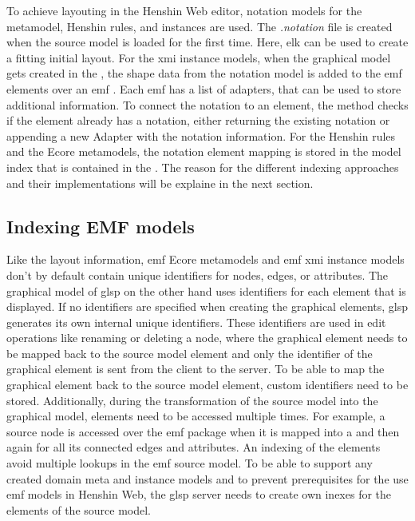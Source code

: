   To achieve layouting in the Henshin Web editor, notation models for the metamodel, Henshin rules, and instances are used. The \textit{.notation} file is created when the source model is loaded for the first time. Here, \ac{elk} can be used to create a fitting initial layout. For the \ac{xmi} instance models, when the graphical model gets created in the , the shape data from the notation model is added to the \ac{emf} elements over an \ac{emf} . Each \ac{emf}  has a list of adapters, that can be used to store additional information. \cite{emf} To connect the notation to an element, the  method checks if the element already has a notation, either returning the existing notation or appending a new Adapter with the notation information.
  For the Henshin rules and the Ecore metamodels, the notation element mapping is stored in the model index that is contained in the . The reason for the different indexing approaches and their implementations will be explaine in the next section. 


  \subsection{Indexing EMF models}
  \label{subsec:indexing}

  Like the layout information, \ac{emf} Ecore metamodels and \ac{emf} \ac{xmi} instance models don't by default contain unique identifiers for nodes, edges, or attributes. \cite{emf,emf-repo} The graphical model of \ac{glsp} on the other hand uses identifiers for each element that is displayed. If no identifiers are specified when creating the graphical elements, \ac{glsp} generates its own internal unique identifiers. These identifiers are used in edit operations like renaming or deleting a node, where the graphical element needs to be mapped back to the source model element and only the identifier of the graphical element is sent from the client to the server. To be able to map the graphical element back to the source model element, custom identifiers need to be stored. Additionally, during the transformation of the source model into the graphical model, elements need to be accessed multiple times. For example, a source node is accessed over the \ac{emf} package when it is mapped into a  and then again for all its connected edges and attributes. An indexing of the elements avoid multiple lookups in the \ac{emf} source model. To be able to support any created domain meta and instance models and to prevent prerequisites for the use \ac{emf} models in Henshin Web, the \ac{glsp} server needs to create own inexes for the elements of the source model. 

